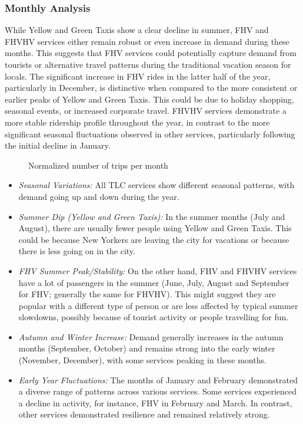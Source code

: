\documentclass[conference]{IEEEtran}
\begin{document}
\subsubsection{Monthly Analysis}

While Yellow and Green Taxis show a clear decline in summer, FHV and FHVHV services either remain robust or even
increase in demand during these months. This suggests that FHV services could potentially capture demand from tourists
or alternative travel patterns during the traditional vacation season for locals. The significant increase in FHV rides
in the latter half of the year, particularly in December, is distinctive when compared to the more consistent or earlier
peaks of Yellow and Green Taxis. This could be due to holiday shopping, seasonal events, or increased corporate travel.
FHVHV services demonstrate a more stable ridership profile throughout the year, in contrast to the more significant
seasonal fluctuations observed in other services, particularly following the initial decline in January.

\begin{figure}[htbp]
  \label{fig:monthly-bar-plot}
  \centering
  
  \caption{Normalized number of trips per month}
\end{figure}

\begin{itemize}
  \item \emph{Seasonal Variations:} All TLC services show different seasonal patterns, with demand going up and down
    during the year.
  \item \emph{Summer Dip (Yellow and Green Taxis):} In the summer months (July and August), there are usually fewer
    people using Yellow and Green Taxis. This could be because New Yorkers are leaving the city for vacations or because
    there is less going on in the city.
  \item \emph{FHV Summer Peak/Stability:} On the other hand, FHV and FHVHV services have a lot of passengers in the
    summer (June, July, August and September for FHV; generally the same for FHVHV). This might suggest they are popular
    with a different type of person or are less affected by typical summer slowdowns, possibly because of tourist
    activity or people travelling for fun.
  \item \emph{Autumn and Winter Increase:} Demand generally increases in the autumn months (September, October) and
    remains strong into the early winter (November, December), with some services peaking in these months.
  \item \emph{Early Year Fluctuations:} The months of January and February demonstrated a diverse range of patterns
    across various services. Some services experienced a decline in activity, for instance, FHV in February and March.
    In contrast, other services demonstrated resilience and remained relatively strong.
\end{itemize}
\end{document}
